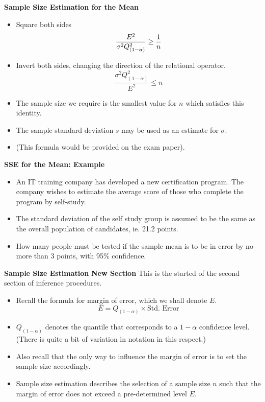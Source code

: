 \documentclass[]{report}
\begin{document}
\textbf{Sample Size Estimation for the Mean}
\begin{itemize}
\item  Square both sides
\[ \frac{E^2}{\sigma^2 Q^2_{(1-\alpha)}} \geq {1 \over n } \]
\item  Invert both sides, changing the direction of the relational operator.
\[ \frac{\sigma^2 Q^2_{(1-\alpha)}}{E^2} \leq n \]

\item  The sample size we require is the smallest value for $n$ which satisfies this identity.
\item  The sample standard deviation $s$ may be used as an estimate for $\sigma$.
\item  (This formula would be provided on the exam paper).
\end{itemize}



\textbf{SSE for the Mean: Example}
\begin{itemize}
\item  An IT training company has developed a new certification program. The company wishes to estimate the average score of those who complete the program by self-study.  \item  The standard deviation of the self study group is assumed to be the same as the overall population of candidates, ie. 21.2 points.
\item  How many people must be tested if the sample mean is to be in error by no more than 3 points, with 95\% confidence.
\end{itemize}


\textbf{Sample Size Estimation}
\textbf{New Section} This is the started of the second section of inference procedures.
\begin{itemize} \item  Recall the formula for margin of error, which we shall denote $E$.
\[  E = Q_{(1-\alpha)} \times \mbox{Std. Error}\]

\item  $Q_{(1-\alpha)}$ denotes the quantile that corresponds to a $1-\alpha$ confidence level. (There is quite a bit of variation in notation in this respect.)
\item  Also recall that the only way to influence the margin of error is to set the sample size accordingly.

\item  Sample size estimation describes the selection of a sample size $n$ such that the margin of error does not exceed a pre-determined level $E$.
\end{itemize}
\end{document}
